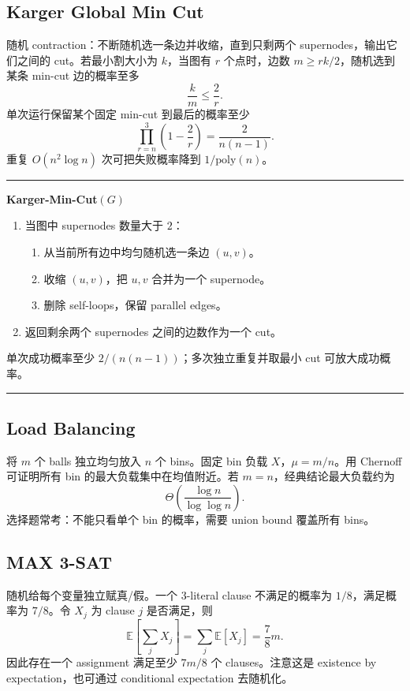 \documentclass[UTF8,a4paper,11pt]{ctexart}
\newenvironment{algobox}[1]
{\par\medskip\noindent\begin{minipage}{0.96\linewidth}\hrule\vspace{0.35em}\textbf{#1}\par\vspace{0.25em}\small}
{\par\vspace{0.25em}\hrule\end{minipage}\par\medskip}
\newcommand{\poly}{\mathrm{poly}}
\begin{document}
\subsection{Karger Global Min Cut}

随机 contraction：不断随机选一条边并收缩，直到只剩两个 supernodes，输出它们之间的 cut。若最小割大小为 $k$，当图有 $r$ 个点时，边数 $m\ge rk/2$，随机选到某条 min-cut 边的概率至多
\[
\frac{k}{m}\le \frac{2}{r}.
\]
单次运行保留某个固定 min-cut 到最后的概率至少
\[
\prod_{r=n}^{3}\left(1-\frac{2}{r}\right)=\frac{2}{n(n-1)}.
\]
重复 $O(n^2\log n)$ 次可把失败概率降到 $1/\poly(n)$。

\begin{algobox}{Karger-Min-Cut$(G)$}
\begin{enumerate}
  \item 当图中 supernodes 数量大于 $2$：
  \begin{enumerate}
    \item 从当前所有边中均匀随机选一条边 $(u,v)$。
    \item 收缩 $(u,v)$，把 $u,v$ 合并为一个 supernode。
    \item 删除 self-loops，保留 parallel edges。
  \end{enumerate}
  \item 返回剩余两个 supernodes 之间的边数作为一个 cut。
\end{enumerate}
单次成功概率至少 $2/(n(n-1))$；多次独立重复并取最小 cut 可放大成功概率。
\end{algobox}

\subsection{Load Balancing}

将 $m$ 个 balls 独立均匀放入 $n$ 个 bins。固定 bin 负载 $X$，$\mu=m/n$。用 Chernoff 可证明所有 bin 的最大负载集中在均值附近。若 $m=n$，经典结论最大负载约为
\[
\Theta\left(\frac{\log n}{\log\log n}\right).
\]
选择题常考：不能只看单个 bin 的概率，需要 union bound 覆盖所有 bins。

\subsection{MAX 3-SAT}

随机给每个变量独立赋真/假。一个 3-literal clause 不满足的概率为 $1/8$，满足概率为 $7/8$。令 $X_j$ 为 clause $j$ 是否满足，则
\[
\mathbb E\left[\sum_j X_j\right]=\sum_j \mathbb E[X_j]=\frac78 m.
\]
因此存在一个 assignment 满足至少 $7m/8$ 个 clauses。注意这是 existence by expectation，也可通过 conditional expectation 去随机化。
\end{document}
